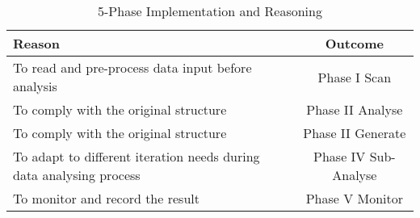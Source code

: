 \begin{table}[!htbp]
\caption{5-Phase Implementation and Reasoning}
\label{table:table4_6}
\centering
\begin{tabular}{lc}
	\toprule
	\textbf{Reason} & \textbf{Outcome} \\
	\midrule
	To read and pre-process data input before
analysis & Phase I Scan \\
	To comply with the original structure	& Phase II Analyse \\
	To comply with the original structure	& Phase II Generate \\
	To adapt to different iteration needs	during
data analysing process & Phase IV Sub-Analyse \\
	To monitor and record the result & Phase V Monitor \\
	\bottomrule
\end{tabular} 
\end{table}
